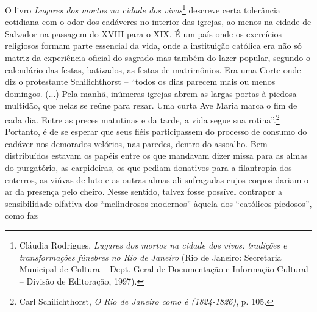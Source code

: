O livro \emph{Lugares dos mortos na cidade dos vivos}\footnote{Cláudia
  Rodrigues, \emph{Lugares dos mortos na cidade dos vivos: tradições e
  transformações fúnebres no Rio de Janeiro} (Rio de Janeiro: Secretaria
  Municipal de Cultura -- Dept. Geral de Documentação e Informação
  Cultural -- Divisão de Editoração, 1997).} descreve certa tolerância
cotidiana com o odor dos cadáveres no interior das igrejas, ao menos na
cidade de Salvador na passagem do XVIII para o XIX. É um país onde os
exercícios religiosos formam parte essencial da vida, onde a instituição
católica era não só matriz da experiência oficial do sagrado mas também
do lazer popular, segundo o calendário das festas, batizados, as festas
de matrimônios. Era uma Corte onde -- diz o protestante Schilichthorst
-- ``todos os dias parecem mais ou menos domingos. (...) Pela manhã,
inúmeras igrejas abrem as largas portas à piedosa multidão, que nelas se
reúne para rezar. Uma curta Ave Maria marca o fim de cada dia. Entre as
preces matutinas e da tarde, a vida segue sua rotina''.\footnote{Carl
  Schilichthorst, \emph{O Rio de Janeiro como é (1824-1826)}, p. 105.}
Portanto, é de se esperar que seus fiéis participassem do processo de
consumo do cadáver nos demorados velórios, nas paredes, dentro do
assoalho. Bem distribuídos estavam os papéis entre os que mandavam dizer
missa para as almas do purgatório, as carpideiras, os que pediam
donativos para a filantropia dos enterros, as viúvas de luto e as outras
almas ali sufragadas cujos corpos dariam o ar da presença pelo cheiro.
Nesse sentido, talvez fosse possível contrapor a sensibilidade olfativa
dos ``melindrosos modernos'' àquela dos ``católicos piedosos'', como faz
